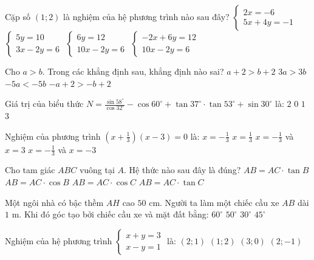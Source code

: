 \documentclass[12pt,a4paper]{article}
\begin{document}
\begin{ex}
Cặp số $(1; 2)$ là nghiệm của hệ phương trình nào sau đây?
\choice
{$\begin{cases} 2x = -6 \\ 5x + 4y = -1 \end{cases}$}
{$\begin{cases} 5y = 10 \\ 3x - 2y = 6 \end{cases}$}
{\True $\begin{cases} 6y = 12 \\ 10x - 2y = 6 \end{cases}$}
{$\begin{cases} -2x + 6y = 12 \\ 10x - 2y = 6 \end{cases}$}
\end{ex}

\begin{ex}
Cho $a > b$. Trong các khẳng định sau, khẳng định nào sai?
\choice
{$a + 2 > b + 2$}
{$3a > 3b$}
{$-5a < -5b$}
{\True $-a + 2 > -b + 2$}
\end{ex}

\begin{ex}
Giá trị của biểu thức $N = \frac{\sin 58^\circ}{\cos 32^\circ} - \cos 60^\circ + \tan 37^\circ \cdot \tan 53^\circ + \sin 30^\circ$ là:
\choice
{\True $2$}
{$0$}
{$1$}
{$3$}
\end{ex}

\begin{ex}
Nghiệm của phương trình $\left(x + \frac{1}{3}\right)(x - 3) = 0$ là:
\choice
{$x = -\frac{1}{3}$}
{$x = \frac{1}{3}$}
{\True $x = -\frac{1}{3}$ và $x = 3$}
{$x = -\frac{1}{3}$ và $x = -3$}
\end{ex}

\begin{ex}
Cho tam giác $ABC$ vuông tại $A$. Hệ thức nào sau đây là đúng?
\choice
{$AB = AC \cdot \tan B$}
{$AB = AC \cdot \cos B$}
{$AB = AC \cdot \cos C$}
{\True $AB = AC \cdot \tan C$}
\end{ex}

\begin{ex}
Một ngôi nhà có bậc thềm $AH$ cao $50\text{ cm}$. Người ta làm một chiếc cầu xe $AB$ dài $1\text{ m}$. Khi đó góc tạo bởi chiếc cầu xe và mặt đất bằng:
\choice
{$60^\circ$}
{$50^\circ$}
{\True $30^\circ$}
{$45^\circ$}
\end{ex}

\begin{ex}
Nghiệm của hệ phương trình $\begin{cases} x + y = 3 \\ x - y = 1 \end{cases}$ là:
\choice
{\True $(2; 1)$}
{$(1; 2)$}
{$(3; 0)$}
{$(2; -1)$}
\end{ex}
\end{document}
